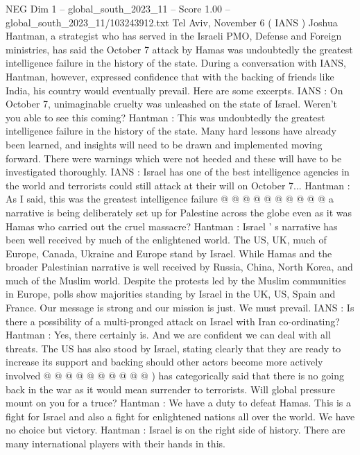 \begin{textsample}{NEG Dim 1 – global\_south\_2023\_11 – Score 1.00 – global\_south\_2023\_11/103243912.txt}  \label{ex:f1_neg_324}
Tel Aviv, November 6 ( IANS ) Joshua Hantman, a strategist who has served in the Israeli PMO, Defense and Foreign ministries, has said the October 7 attack by Hamas was undoubtedly the greatest intelligence failure in the history of the state.
During a conversation with IANS, Hantman, however, expressed confidence that with the backing of friends like India, his country would eventually prevail.
Here are some excerpts.
IANS : On October 7, unimaginable cruelty was unleashed on the state of Israel.
Weren't you able to see this coming?
Hantman : This was undoubtedly the greatest intelligence failure in the history of the state.
Many hard lessons have already been learned, and insights will need to be drawn and implemented moving forward.
There were warnings which were not heeded and these will have to be investigated thoroughly.
IANS : Israel has one of the best intelligence agencies in the world and terrorists could still attack at their will on October 7...
Hantman : As I said, this was the greatest intelligence failure @ @ @ @ @ @ @ @ @ @ a narrative is being deliberately set up for Palestine across the globe even as it was Hamas who carried out the cruel massacre?
Hantman : Israel ' s narrative has been well received by much of the enlightened world.
The US, UK, much of Europe, Canada, Ukraine and Europe stand by Israel.
While Hamas and the broader Palestinian narrative is well received by Russia, China, North Korea, and much of the Muslim world.
Despite the protests led by the Muslim communities in Europe, polls show majorities standing by Israel in the UK, US, Spain and France.
Our message is strong and our mission is just.
We must prevail.
IANS : Is there a possibility of a multi-pronged attack on Israel with Iran co-ordinating?
Hantman : Yes, there certainly is.
And we are confident we can deal with all threats.
The US has also stood by Israel, stating clearly that they are ready to increase its support and backing should other actors become more actively involved @ @ @ @ @ @ @ @ @ @ ) has categorically said that there is no going back in the war as it would mean surrender to terrorists.
Will global pressure mount on you for a truce?
Hantman : We have a duty to defeat Hamas.
This is a fight for Israel and also a fight for enlightened nations all over the world.
We have no choice but victory.
Hantman : Israel is on the right side of history.
There are many international players with their hands in this.

\end{textsample}
